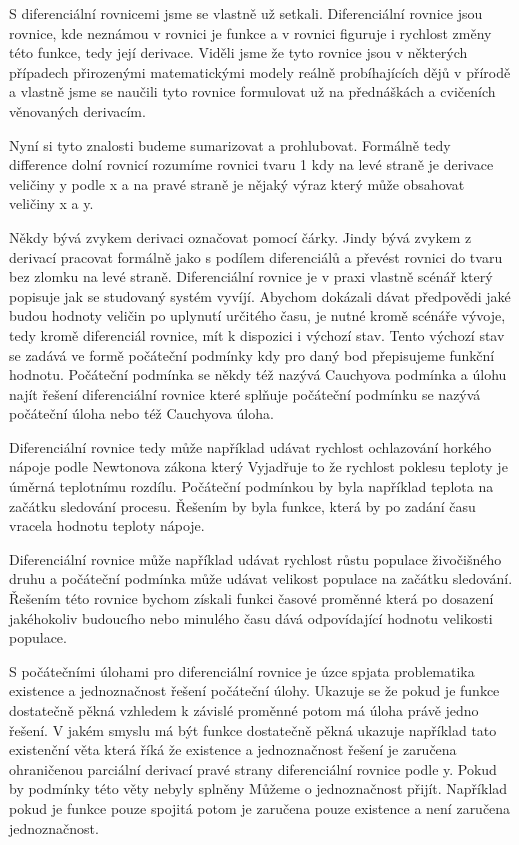 S diferenciální rovnicemi jsme se vlastně už setkali. Diferenciální rovnice jsou rovnice, kde neznámou v rovnici je funkce a v rovnici figuruje i rychlost změny této funkce, tedy její derivace. Viděli jsme že tyto rovnice jsou v některých případech přirozenými matematickými modely reálně probíhajících dějů v přírodě a vlastně jsme se naučili tyto rovnice formulovat už na přednáškách a cvičeních věnovaných derivacím. 

Nyní si tyto znalosti budeme sumarizovat a prohlubovat. Formálně tedy difference dolní rovnicí rozumíme rovnici tvaru 1 kdy na levé straně je derivace veličiny y podle x a na pravé straně je nějaký výraz který může obsahovat veličiny x a y. 

Někdy bývá zvykem derivaci označovat pomocí čárky. Jindy bývá zvykem z derivací pracovat formálně jako s podílem diferenciálů a převést rovnici do tvaru bez zlomku na levé straně. Diferenciální rovnice je v praxi vlastně scénář který popisuje jak se studovaný systém vyvíjí. Abychom dokázali dávat předpovědi jaké budou hodnoty veličin po uplynutí určitého času, je nutné kromě scénáře vývoje, tedy kromě diferenciál rovnice, mít k dispozici i výchozí stav. Tento výchozí stav se zadává ve formě počáteční podmínky kdy pro daný bod přepisujeme funkční hodnotu. Počáteční podmínka se někdy též nazývá Cauchyova podmínka a úlohu najít řešení diferenciální rovnice které splňuje počáteční podmínku se nazývá počáteční úloha nebo též Cauchyova úloha. 

Diferenciální rovnice tedy může například udávat rychlost ochlazování horkého nápoje podle Newtonova zákona který Vyjadřuje to že rychlost poklesu teploty je úměrná teplotnímu rozdílu. Počáteční podmínkou by byla například teplota na začátku sledování procesu. Řešením by byla funkce, která by po zadání času vracela hodnotu teploty nápoje. 

Diferenciální rovnice může například udávat rychlost růstu populace živočišného druhu a počáteční podmínka může udávat velikost populace na začátku sledování. Řešením této rovnice bychom získali funkci časové proměnné která po dosazení jakéhokoliv budoucího nebo minulého času dává odpovídající hodnotu velikosti populace. 

S počátečními úlohami pro diferenciální rovnice je úzce spjata problematika existence a jednoznačnost řešení počáteční úlohy. Ukazuje se že pokud je funkce dostatečně pěkná vzhledem k závislé proměnné potom má úloha právě jedno řešení. V jakém smyslu má být funkce dostatečně pěkná ukazuje například tato existenční věta která říká že existence a jednoznačnost řešení je zaručena ohraničenou parciální derivací pravé strany diferenciální rovnice podle y. Pokud by podmínky této věty nebyly splněny Můžeme o jednoznačnost přijít. Například pokud je funkce pouze spojitá potom je zaručena pouze existence a není zaručena jednoznačnost. 

